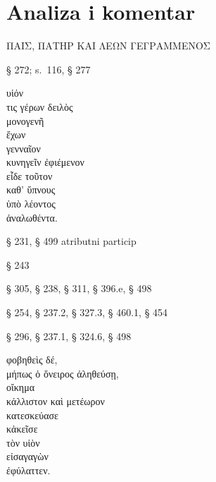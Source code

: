 \section*{Analiza i komentar}



{\large
\begin{greek}
\noindent ΠΑΙΣ, ΠΑΤΗΡ ΚΑΙ ΛΕΩΝ ΓΕΓΡΑΜΜΕΝΟΣ

\end{greek}
}

\begin{description}[noitemsep]
\item[ΓΕΓΡΑΜΜΕΝΟΣ] § 272; s.\ 116, § 277
\end{description}



{\large
\begin{greek}
\noindent υἱόν\\
τις γέρων δειλὸς \\
\tabto{2em} μονογενῆ \\
ἔχων \\
\tabto{2em} γενναῖον \\
\tabto{2em} κυνηγεῖν ἐφιέμενον \\
εἶδε τοῦτον \\
\tabto{2em} καθ' ὕπνους \\
\tabto{4em} ὑπὸ λέοντος \\
\tabto{2em} ἀναλωθέντα.\\

\end{greek}
}

\begin{description}[noitemsep]
\item[ἔχων] § 231, § 499 atributni particip
\item[κυνηγεῖν] § 243
\item[ἐφιέμενον] § 305, § 238, § 311, § 396.e, § 498
\item[εἶδε] § 254, § 237.2, § 327.3, § 460.1, § 454
\item[ἀναλωθέντα] § 296, § 237.1, § 324.6, § 498
\end{description}




{\large
\begin{greek}
\noindent φοβηθεὶς δέ, \\
\tabto{2em} μήπως ὁ ὄνειρος ἀληθεύσῃ, \\
οἴκημα \\
\tabto{2em} κάλλιστον καὶ μετέωρον \\
κατεσκεύασε \\
κἀκεῖσε \\
\tabto{4em} τὸν υἱὸν \\
\tabto{2em} εἰσαγαγὼν \\
ἐφύλαττεν.\\

\end{greek}
}

